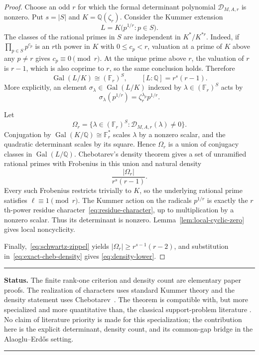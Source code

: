 \documentclass[11pt,oneside]{article}
\theoremstyle{definition}
\theoremstyle{remark}
\newcommand{\Q}{\mathbb Q}
\newcommand{\F}{\mathbb F}
\newcommand{\Gal}{\operatorname{Gal}}
\newcommand{\AEname}{Alaoglu--Erd\H{o}s}
\newenvironment{statusbox}[1]
{\begin{center}\begin{minipage}{0.94\textwidth}\hrule\vspace{0.45em}\textbf{Status.} #1\par\vspace{0.35em}}
{\vspace{0.35em}\hrule\end{minipage}\end{center}}
\begin{document}
\begin{proof}
Choose an odd $r$ for which the formal determinant polynomial
$\mathscr D_{M,A,r}$ is nonzero.  Put $s=|S|$ and
$K=\Q(\zeta_r)$.  Consider the Kummer extension
\begin{equation}
 L=K\bigl(p^{1/r}:p\in S\bigr).
 \label{eq:kummer-field}
\end{equation}
The classes of the rational primes in $S$ are independent in $K^*/K^{*r}$.  Indeed, if
$\prod_{p\in S}p^{c_p}$ is an $r$th power in $K$ with $0\le c_p<r$, valuation at a prime of
$K$ above any $p\ne r$ gives $c_p\equiv0\pmod r$.  At the unique prime above $r$, the
valuation of $r$ is $r-1$, which is also coprime to $r$, so the same conclusion holds.
Therefore
\begin{equation}
 \Gal(L/K)\cong(\F_r)^S,
 \qquad [L:\Q]=r^s(r-1).
 \label{eq:kummer-galois}
\end{equation}
More explicitly, an element $\sigma_\lambda\in\Gal(L/K)$ indexed by
$\lambda\in(\F_r)^S$ acts by
\[
 \sigma_\lambda(p^{1/r})=\zeta_r^{\lambda_p}p^{1/r}.
\]

Let
\[
 \Omega_r=\{\lambda\in(\F_r)^S:
              \mathscr D_{M,A,r}(\lambda)\ne0\}.
\]
Conjugation by $\Gal(K/\Q)\cong\F_r^*$ scales $\lambda$ by a nonzero scalar, and the
quadratic determinant scales by its square.  Hence $\Omega_r$ is a union of conjugacy classes
in $\Gal(L/\Q)$.  Chebotarev's density theorem gives a set of unramified rational primes with
Frobenius in this union and natural density
\begin{equation}
 \frac{|\Omega_r|}{r^s(r-1)}.
 \label{eq:exact-cheb-density}
\end{equation}
Every such Frobenius restricts trivially to $K$, so the underlying rational prime satisfies
$\ell\equiv1\pmod r$.  The Kummer action on the radicals $p^{1/r}$ is exactly the
$r$th-power residue character~\eqref{eq:residue-character}, up to multiplication by a
nonzero scalar.  Thus its determinant is nonzero.  Lemma~\ref{lem:local-cyclic-zero} gives
local noncyclicity.

Finally,~\eqref{eq:schwartz-zippel} yields
$|\Omega_r|\ge r^{s-1}(r-2)$, and substitution in~\eqref{eq:exact-cheb-density} gives
\eqref{eq:density-lower}.
\end{proof}

\begin{statusbox}{The finite rank-one criterion and density count are elementary paper proofs.
The realization of characters uses standard Kummer theory and the density statement uses
Chebotarev~\cite{Washington,Neukirch}.  The theorem is compatible with, but more specialized
and more quantitative than, the classical support-problem literature
\cite{CorralesSchoof,PeruccaSupport}.  No claim of literature priority is made for this
specialization; the contribution here is the explicit determinant, density count, and its
common-gap bridge in the \AEname{} setting.}
\end{statusbox}
\end{document}
